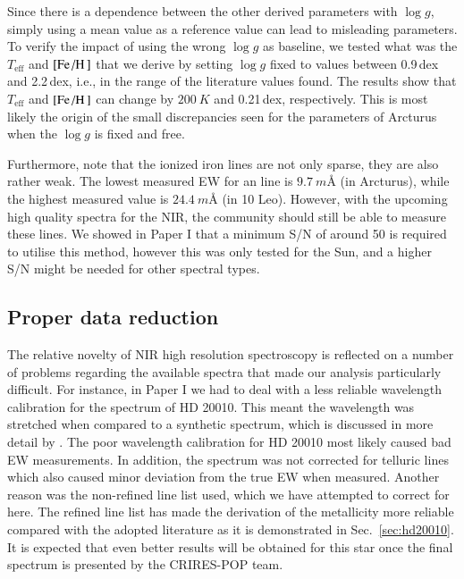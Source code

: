 \documentclass{aa}
\begin{document}
Since there is a dependence between the other derived parameters with $\log g$,
simply using a mean value as a reference value can lead to misleading
parameters. To verify the impact of using the wrong $\log g$ as baseline, we
tested what was the $T_\mathrm{eff}$ and $[\ion{Fe}/\ion{H}]$ that we derive by
setting $\log g$ fixed to values between 0.9\,dex and 2.2\,dex, i.e., in the
range of the literature values found. The results show that $T_\mathrm{eff}$ and
$[\ion{Fe}/\ion{H}]$ can change by $\SI{200}{K}$ and 0.21\,dex, respectively.
This is most likely the origin of the small discrepancies seen for the
parameters of Arcturus when the $\log g$ is fixed and free.

Furthermore, note that the ionized iron lines are not only sparse, they are also
rather weak. The lowest measured EW for an  line is
$\SI{9.7}{m}$\AA{} (in Arcturus), while the highest measured value is
$\SI{24.4}{m}$\AA{} (in 10 Leo). However, with the upcoming high quality spectra
for the NIR, the community should still be able to measure these 
lines. We showed in Paper I that a minimum S/N of around 50 is required to
utilise this method, however this was only tested for the Sun, and a higher S/N
might be needed for other spectral types.


\subsection{Proper data reduction}

The relative novelty of NIR high resolution spectroscopy is reflected on a
number of problems regarding the available spectra that made our analysis
particularly difficult. For instance, in Paper I we had to deal with a less
reliable wavelength calibration for the spectrum of HD 20010. This meant the
wavelength was stretched when compared to a synthetic spectrum, which is
discussed in more detail by \citet{Nicholls2017}. The poor wavelength
calibration for HD 20010 most likely caused bad EW measurements. In addition,
the spectrum was not corrected for telluric lines which also caused minor
deviation from the true EW when measured. Another reason was the non-refined
line list used, which we have attempted to correct for here. The refined line
list has made the derivation of the metallicity more reliable compared with the
adopted literature as it is demonstrated in Sec.~\ref{sec:hd20010}. It is
expected that even better results will be obtained for this star once the final
spectrum is presented by the CRIRES-POP team.
\end{document}
